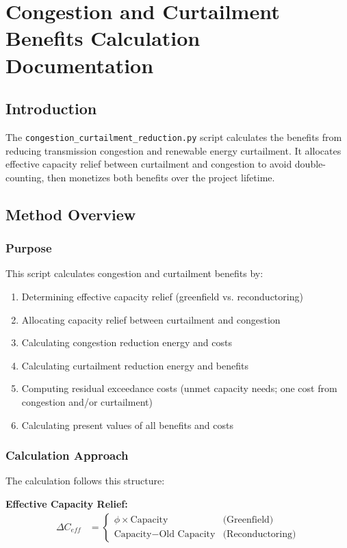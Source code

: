 \documentclass[ctcc_full_documentation.tex]{subfiles}
\begin{document}
\chapter{Congestion and Curtailment Benefits Calculation Documentation}

\section{Introduction}

The \texttt{congestion\_curtailment\_reduction.py} script calculates the benefits from reducing transmission congestion and renewable energy curtailment. It allocates effective capacity relief between curtailment and congestion to avoid double-counting, then monetizes both benefits over the project lifetime.

\section{Method Overview}

\subsection{Purpose}

This script calculates congestion and curtailment benefits by:
\begin{enumerate}
    \item Determining effective capacity relief (greenfield vs. reconductoring)
    \item Allocating capacity relief between curtailment and congestion
    \item Calculating congestion reduction energy and costs
    \item Calculating curtailment reduction energy and benefits
    \item Computing residual exceedance costs (unmet capacity needs; one cost from congestion and/or curtailment)
    \item Calculating present values of all benefits and costs
\end{enumerate}

\subsection{Calculation Approach}

The calculation follows this structure:

\textbf{Effective Capacity Relief:}
\begin{align}
\Delta C_{eff} &= \begin{cases}
\phi \times \text{Capacity} & \text{(Greenfield)} \\
\text{Capacity} - \text{Old Capacity} & \text{(Reconductoring)}
\end{cases}
\end{align}
\end{document}
